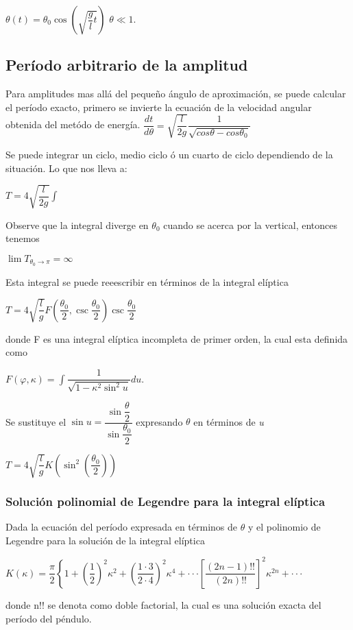 \documentclass[12pt]{article}
\begin{document}
$\theta(t)=\theta_0\cos\left(\sqrt{\dfrac{g}{l}t}\right)$                  $\theta\ll 1.$
\subsection*{Período arbitrario de la amplitud}

Para amplitudes mas allá del pequeño ángulo de aproximación, se puede calcular el período exacto, primero se invierte la ecuación de la velocidad angular obtenida del metódo de energía.
$\dfrac{dt}{d\theta}=\sqrt{\dfrac{l}{2g}}\dfrac{1}{\sqrt{cos\theta-cos\theta_0}}$

Se puede integrar un ciclo, medio ciclo ó un cuarto de ciclo dependiendo de la situación.
Lo que nos lleva a:

$T=4\sqrt{\dfrac{l}{2g}}\int$

Observe que la integral diverge en $\theta_0$  cuando se acerca por la vertical, entonces tenemos

$\lim T_{\theta_0\longrightarrow\pi} =\infty$

Esta integral se puede reeescribir en términos de la integral elíptica 

$T=4\sqrt{\dfrac{l}{g}}F\left(\dfrac{\theta_0}{2},\csc\dfrac{\theta_0}{2}\right)\csc\dfrac{\theta_0}{2}$

donde F es una integral elíptica incompleta de primer orden, la cual esta definida como

$F(\varphi,\kappa)=\int\dfrac{1}{\sqrt{1-\kappa^2\sin^2u}}du.$

Se sustituye el 
$\sin u=\dfrac{\sin\dfrac{\theta}{2}}{\sin\dfrac{\theta_0}{2}}$ expresando $\theta$ en términos de \textit{u}


$T=4\sqrt{\dfrac{l}{g}}K\left(\sin^2\left(\dfrac{\theta_0}{2}\right)\right)$
\subsubsection*{Solución polinomial de Legendre para la integral elíptica}

Dada la ecuación del período expresada en términos de $\theta$ y el polinomio de Legendre para la solución de la integral elíptica


$K(\kappa)=\dfrac{\pi}{2} \left\lbrace 1+\left(\dfrac{1}{2}\right)^2\right.\kappa^2 + \left(\dfrac{1\cdot 3}{2\cdot 4}\right)^2\kappa^4+\cdot\cdot\cdot \left[\dfrac{(2n-1)!!}{(2n)!!}\right]^2\kappa^{2n} + \cdot\cdot\cdot $


donde n!! se denota como doble factorial, la cual es una solución exacta del período del péndulo.
\end{document}
